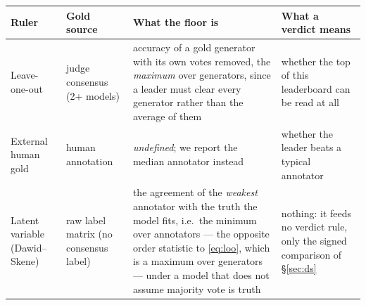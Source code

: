 \begin{tabular}{p{2.15cm}p{2.5cm}p{2.4cm}p{3.55cm}}
\toprule
Ruler & Gold source & What the floor is & What a verdict means \\
\midrule
Leave-one-out &
judge consensus (2+ models) &
accuracy of a gold generator with its own votes removed, the \emph{maximum}
over generators, since a leader must clear every generator rather than the
average of them &
whether the top of this leaderboard can be read at all \\[2pt]
External human gold &
human annotation &
\emph{undefined}; we report the median annotator instead &
whether the leader beats a typical annotator \\[2pt]
Latent variable (Dawid--Skene) &
raw label matrix (no consensus label) &
the agreement of the \emph{weakest} annotator with the truth the model fits,
i.e.\ the minimum over annotators --- the opposite order statistic to
\eqref{eq:loo}, which is a maximum over generators --- under a model that does
not assume majority vote is truth &
nothing: it feeds no verdict rule, only the signed comparison of
\S\ref{sec:ds} \\
\bottomrule
\end{tabular}
